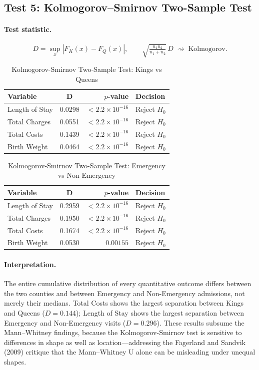 \documentclass[12pt]{article}
\begin{document}
\subsection{Test 5: Kolmogorov--Smirnov Two-Sample Test}

\paragraph{Test statistic.}
\[
  D = \sup_x |F_K(x) - F_Q(x)|,
  \qquad
  \sqrt{\tfrac{n_1 n_2}{n_1+n_2}}\, D \;\rightsquigarrow\; \text{Kolmogorov}.
\]

\begin{table}[H]
\centering
\caption{Kolmogorov-Smirnov Two-Sample Test: Kings vs Queens}
\label{tab:ks}
\begin{tabular}{lcr l}
\toprule
\textbf{Variable} & \textbf{D} & \textbf{$p$-value} & \textbf{Decision} \\
\midrule
Length of Stay & 0.0298 & $< 2.2\times 10^{-16}$ & Reject $H_0$ \\
Total Charges  & 0.0551 & $< 2.2\times 10^{-16}$ & Reject $H_0$ \\
Total Costs    & 0.1439 & $< 2.2\times 10^{-16}$ & Reject $H_0$ \\
Birth Weight   & 0.0464 & $< 2.2\times 10^{-16}$ & Reject $H_0$ \\
\bottomrule
\end{tabular}
\end{table}

\begin{table}[H]
\centering
\caption{Kolmogorov-Smirnov Two-Sample Test: Emergency vs Non-Emergency}
\label{tab:ks-ed}
\begin{tabular}{lcr l}
\toprule
\textbf{Variable} & \textbf{D} & \textbf{$p$-value} & \textbf{Decision} \\
\midrule
Length of Stay & 0.2959 & $< 2.2\times 10^{-16}$ & Reject $H_0$ \\
Total Charges  & 0.1950 & $< 2.2\times 10^{-16}$ & Reject $H_0$ \\
Total Costs    & 0.1674 & $< 2.2\times 10^{-16}$ & Reject $H_0$ \\
Birth Weight   & 0.0530 & $0.00155$ & Reject $H_0$ \\
\bottomrule
\end{tabular}
\end{table}

\paragraph{Interpretation.}
The entire cumulative distribution of every quantitative outcome
differs between the two counties and between Emergency and
Non-Emergency admissions, not merely their medians. Total Costs shows
the largest separation between Kings and Queens ($D=0.144$); Length of Stay shows
the largest separation between Emergency and Non-Emergency visits
($D=0.296$). These results subsume the Mann--Whitney findings, because
the Kolmogorov-Smirnov test is sensitive to differences in shape as well as
location---addressing the Fagerland and Sandvik (2009) critique that
the Mann--Whitney U alone can be misleading under unequal shapes.
\end{document}
